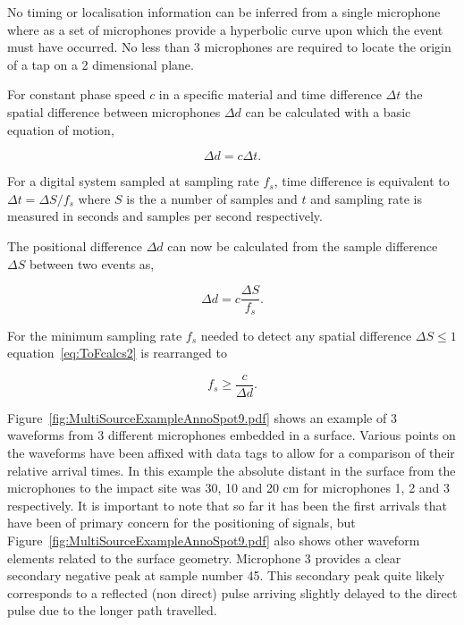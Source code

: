 No timing or localisation information can be inferred from a single microphone where as a set of microphones provide a hyperbolic curve upon which the event must have occurred. No less than 3 microphones are required to locate the origin of a tap on a 2 dimensional plane\cite{US7411581}. %

For constant phase speed $c$ in a specific material and time difference $\Delta t$ the spatial difference between microphones $\Delta d$ can be calculated with a basic equation of motion,

\begin{equation}\label{eq:ToFcalcs1}
\Delta d  = c \Delta t.
\end{equation}

For a digital system sampled at sampling rate $f_s$, time difference is equivalent to $\Delta t = \Delta S/f_s$ where $S$ is the a number of samples and $t$ and sampling rate is measured in seconds and samples per second respectively.

The positional difference $\Delta d$ can now be calculated from the sample difference $\Delta S$ between two events as,

\begin{equation}\label{eq:ToFcalcs2}
\Delta d  = c \frac{\Delta S}{f_s}.
\end{equation}

For the minimum sampling rate $f_s$ needed to detect any spatial difference $\Delta S \leq 1$ equation~\ref{eq:ToFcalcs2} is rearranged to

\begin{equation}\label{eq:ToFcalcs3}
f_s  \geq \frac{c}{\Delta d}.
\end{equation}

Figure~\ref{fig:MultiSourceExampleAnnoSpot9.pdf} shows an example of 3 waveforms from 3 different microphones embedded in a surface. Various points on the waveforms have been affixed with data tags to allow for a comparison of their relative arrival times. In this example the absolute distant in the surface from the microphones to the impact site was 30, 10 and 20 cm for microphones 1, 2 and 3 respectively. It is important to note that so far it has been the first arrivals that have been of primary concern for the positioning of signals, but Figure~\ref{fig:MultiSourceExampleAnnoSpot9.pdf} also shows other waveform elements related to the surface geometry. Microphone 3 provides a clear secondary negative peak at sample number 45. This secondary peak quite likely corresponds to a reflected (non direct) pulse arriving slightly delayed to the direct pulse due to the longer path travelled.

